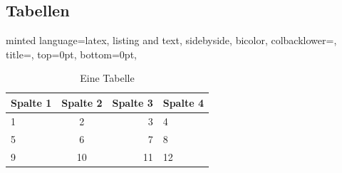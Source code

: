 \documentclass[
    ngerman,
    accentcolor=3b,
    dark_mode,
    fontsize= 12pt,
    a4paper,
    aspectratio=169,
    colorback=true,
    fancy_row_colors,
    leqno,
    fleqn,
    boxarc=3pt,
    fleqn,
]{algoslides}
\begin{document}
    \subsection{Tabellen}
    \begin{frame}[c, fragile]
        \slidehead{}
        \vspace{-2em}
        \footnotesize
        \begin{codeBlock}[
            ]{
            minted language=latex,
            listing and text,
            sidebyside,
            bicolor,
            colbacklower=,
            title=,
            top=0pt,
            bottom=0pt,
            }
            \begin{table}
                \begin{tabular}{lcrp{2cm}}
                    \toprule
                    \textbf{Spalte 1} & \textbf{Spalte 2} & \textbf{Spalte 3} & \textbf{Spalte 4} \\
                    \midrule
                    1 & 2 & 3 & 4 \\
                    5 & 6 & 7 & 8 \\
                    9 & 10 & 11 & 12 \\
                    \bottomrule
                \end{tabular}
                \caption{Eine Tabelle}
                \label{tab:table}
            \end{table}
        \end{codeBlock}
    \end{frame}
\end{document}
